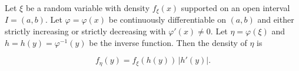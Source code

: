 Let $\xi$ be a random variable with density $f_\xi(x)$ supported on an open interval $I = (a, b)$. Let $\varphi = \varphi(x)$ be continuously differentiable on $(a, b)$ and either strictly increasing or strictly decreasing with $\varphi'(x) \neq 0$. Let $\eta = \varphi(\xi)$ and $h = h(y) = \varphi^{-1}(y)$ be the inverse function. Then the density of $\eta$ is

$$f_\eta(y) = f_\xi(h(y)) \, |h'(y)|.$$
